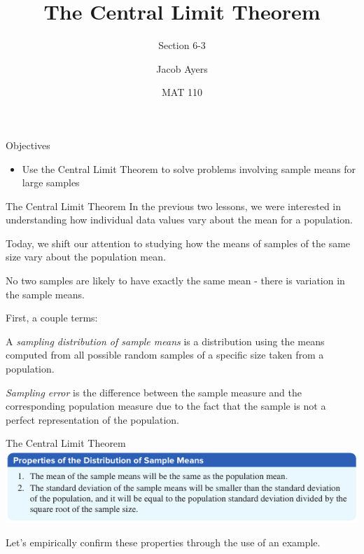 \documentclass[t, aspectratio=169]{beamer}
\title[6-3]{The Central Limit Theorem}
\subtitle{Section 6-3}
\author{Jacob Ayers}
\institute{Lesson \#19}
\date{MAT 110}
\newcommand{\?}{\stackrel{?}{=}}
\begin{document}
	
	\begin{frame}
		\titlepage
	\end{frame}
	
	\begin{frame}{Objectives}
		\begin{itemize}
			\item Use the Central Limit Theorem to solve problems involving sample means for large samples
		\end{itemize}
	\end{frame}

	\begin{frame}{The Central Limit Theorem}
		In the previous two lessons, we were interested in understanding how individual data values vary about the mean for a population. \pause
		
		Today, we shift our attention to studying how the means of samples of the same size vary about the population mean. \pause
		
		No two samples are likely to have exactly the same mean - there is variation in the sample means. \pause
		
		First, a couple terms:
		
		A \textit{sampling distribution of sample means} is a distribution using the means computed from all possible random samples of a specific size taken from a population. \pause
		
		\textit{Sampling error} is the difference between the sample measure and the corresponding population measure due to the fact that the sample is not a perfect representation of the population.
	\end{frame}

	\begin{frame}{The Central Limit Theorem}
		\includegraphics[width=\textwidth]{sample-mean-props} \pause
		
		Let's empirically confirm these properties through the use of an example.
	\end{frame}
\end{document}
